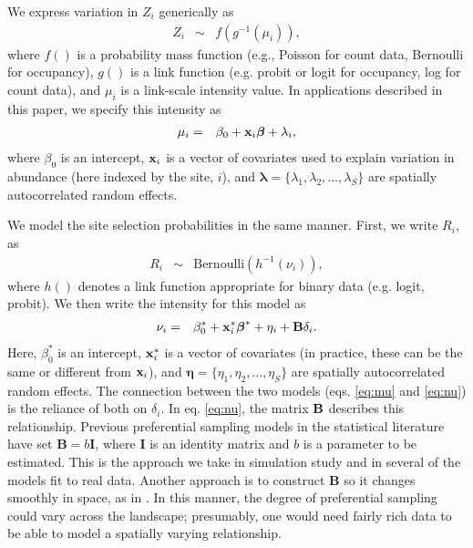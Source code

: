 \documentclass[times,mee,doublespace,]{besauth2}
\begin{document}
\begin{flushleft}
\hspace{0.5in} We express variation in $Z_i$ generically as
\begin{eqnarray}
  \label{eq:process}
  Z_i & \sim & f(g^{-1}(\mu_i)),
\end{eqnarray}
where $f()$ is a probability mass function (e.g., Poisson for count data, Bernoulli for occupancy), $g()$ is a link function (e.g. probit or logit for occupancy, log for count data), and $\mu_i$ is a link-scale intensity value.  In applications described in this paper, we specify this intensity as
\begin{eqnarray}
\mu_i & = & \beta_0 + {\bf x}_i \boldsymbol{\beta}+\lambda_i,
 \label{eq:mu}
\end{eqnarray}
where $\beta_0$ is an intercept, ${\bf x}_i$ is a vector of covariates used to explain variation in abundance (here indexed by the site, $i$), and $\boldsymbol{\lambda}=\{ \lambda_1,\lambda_2,\hdots,\lambda_S \}$ are spatially autocorrelated random effects.

\hspace{0.5in} We model the site selection probabilities in the same manner.  First, we write $R_i$, as
\begin{eqnarray}
 \label{eq:R}
  R_i & \sim & \text{Bernoulli}(h^{-1}(\nu_i)),
\end{eqnarray}
where $h()$ denotes a link function appropriate for binary data (e.g. logit, probit).  We then write the intensity for this model as
\begin{eqnarray}
  \label{eq:nu}
  \nu_i & = & \beta_0^* + {\bf x}_i^* \boldsymbol{\beta}^*+\eta_i+{\bf B} \delta_i.
\label{eq:nu}
\end{eqnarray}
Here, $\beta_0^*$ is an intercept, ${\bf x}_i^*$ is a vector of covariates (in practice, these can be the same or different from ${\bf x}_i$), and $\boldsymbol{\eta}=\{ \eta_1,\eta_2,\hdots,\eta_S \}$ are spatially autocorrelated random effects.  The connection between the two models (eqs. \ref{eq:mu} and \ref{eq:nu}) is the reliance of both on $\delta_i$.  In eq. \ref{eq:nu}, the matrix ${\bf B}$ describes this relationship.  Previous preferential sampling models in the statistical literature have set $\textbf{B} = b \textbf{I}$, where $\textbf{I}$ is an identity matrix and $b$ is a parameter to be estimated.  This is the approach we take in simulation study and in several of the models fit to real data.  Another approach is to construct $\textbf{B}$ so it changes smoothly in space, as in \citep{RoyleBerliner1999}.  In this manner, the degree of preferential sampling could vary across the landscape; presumably, one would need fairly rich data to be able to model a spatially varying relationship.  


\end{flushleft}
\end{document}

